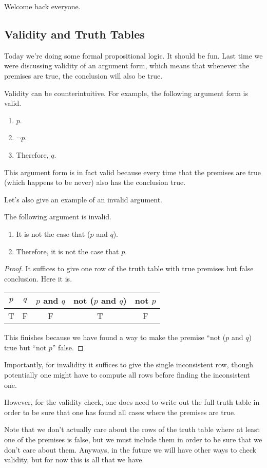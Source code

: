 \documentclass[../notes.tex]{subfiles}
\begin{document}

Welcome back everyone.

\subsection{Validity and Truth Tables}
Today we're doing some formal propositional logic. It should be fun. Last time we were discussing validity of an argument form, which means that whenever the premises are true, the conclusion will also be true.
\begin{ex}
	Validity can be counterintuitive. For example, the following argument form is valid.
	\begin{enumerate}
		\item $p$.
		\item $\lnot p$.
		\item Therefore, $q$.
	\end{enumerate}
	This argument form is in fact valid because every time that the premises are true (which happens to be never) also has the conclusion true.
\end{ex}
Let's also give an example of an invalid argument.
\begin{exe}
	The following argument is invalid.
	\begin{enumerate}
		\item It is not the case that ($p$ and $q$).
		\item Therefore, it is not the case that $p$.
	\end{enumerate}
\end{exe}
\begin{proof}
	It suffices to give one row of the truth table with true premises but false conclusion. Here it is.
	\begin{center}
		\begin{tabular}{c|c||c|c||c}
			$p$ & $q$ & $p$ and $q$ & not ($p$ and $q$) & not $p$ \\\hline
			T & F & F & T & F
		\end{tabular}
	\end{center}
	This finishes because we have found a way to make the premise ``not ($p$ and $q$) true but ``not $p$'' false.
\end{proof}
Importantly, for invalidity it suffices to give the single inconsistent row, though potentially one might have to compute all rows before finding the inconsistent one.
\begin{warn}
	However, for the validity check, one does need to write out the full truth table in order to be sure that one has found all cases where the premises are true.
\end{warn}
Note that we don't actually care about the rows of the truth table where at least one of the premises is false, but we must include them in order to be sure that we don't care about them. Anyways, in the future we will have other ways to check validity, but for now this is all that we have.
\end{document}
